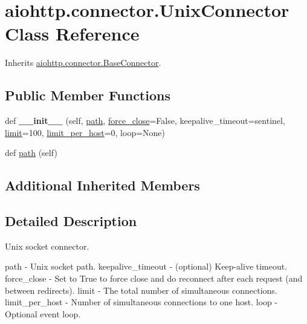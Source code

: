\hypertarget{classaiohttp_1_1connector_1_1_unix_connector}{}\section{aiohttp.\+connector.\+Unix\+Connector Class Reference}
\label{classaiohttp_1_1connector_1_1_unix_connector}


Inherits \hyperlink{classaiohttp_1_1connector_1_1_base_connector}{aiohttp.\+connector.\+Base\+Connector}.

\subsection*{Public Member Functions}
\begin{DoxyCompactItemize}
\item 
\mbox{\label{classaiohttp_1_1connector_1_1_unix_connector_a1a8a4d670950306ec9699d5b52a16724}} 
def {\bfseries \+\_\+\+\_\+init\+\_\+\+\_\+} (self, \hyperlink{classaiohttp_1_1connector_1_1_unix_connector_a15da4cbb60292fc35f32dcf2c3dbb622}{path}, \hyperlink{classaiohttp_1_1connector_1_1_base_connector_ae732f0e680ae1c5d35c57417a5cd9c4e}{force\+\_\+close}=False, keepalive\+\_\+timeout=sentinel, \hyperlink{classaiohttp_1_1connector_1_1_base_connector_a9ae454fca119e032ccf66cb4745f4fbe}{limit}=100, \hyperlink{classaiohttp_1_1connector_1_1_base_connector_adce24e0088f2017dcc7338b65a708f04}{limit\+\_\+per\+\_\+host}=0, loop=None)
\item 
def \hyperlink{classaiohttp_1_1connector_1_1_unix_connector_a15da4cbb60292fc35f32dcf2c3dbb622}{path} (self)
\end{DoxyCompactItemize}
\subsection*{Additional Inherited Members}


\subsection{Detailed Description}
\begin{DoxyVerb}Unix socket connector.

path - Unix socket path.
keepalive_timeout - (optional) Keep-alive timeout.
force_close - Set to True to force close and do reconnect
    after each request (and between redirects).
limit - The total number of simultaneous connections.
limit_per_host - Number of simultaneous connections to one host.
loop - Optional event loop.
\end{DoxyVerb}
 

